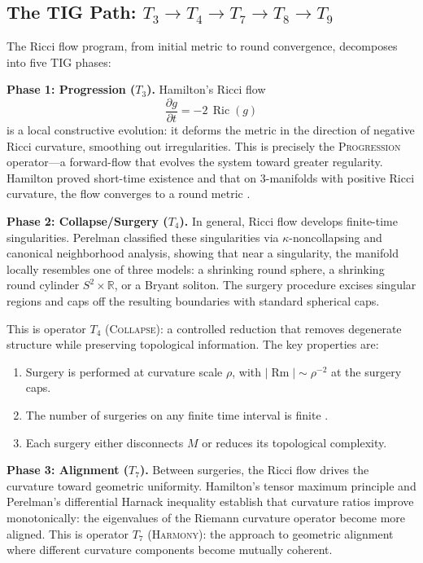 \documentclass[11pt]{article}
\DeclareMathOperator{\Ric}{Ric}
\DeclareMathOperator{\Rm}{Rm}
\begin{document}
\subsection{The TIG Path: $T_3 \to T_4 \to T_7 \to T_8 \to T_9$}
\label{subsec:poinc-path}

The Ricci flow program, from initial metric to round convergence,
decomposes into five TIG phases:

\medskip
\noindent
\textbf{Phase 1: Progression ($T_3$).}
Hamilton's Ricci flow \cite{Ham82}
\begin{equation}
\label{eq:ricci}
\frac{\partial g}{\partial t} = -2\, \Ric(g)
\end{equation}
is a local constructive evolution: it deforms the metric in the
direction of negative Ricci curvature, smoothing out irregularities.
This is precisely the \textsc{Progression} operator---a forward-flow
that evolves the system toward greater regularity.  Hamilton proved
short-time existence and that on 3-manifolds with positive Ricci
curvature, the flow converges to a round metric \cite{Ham82}.

\medskip
\noindent
\textbf{Phase 2: Collapse/Surgery ($T_4$).}
In general, Ricci flow develops finite-time singularities.  Perelman
\cite{Per2} classified these singularities via $\kappa$-noncollapsing
and canonical neighborhood analysis, showing that near a singularity,
the manifold locally resembles one of three models: a shrinking round
sphere, a shrinking round cylinder $S^2 \times \mathbb{R}$, or a
Bryant soliton.  The surgery procedure excises singular regions and
caps off the resulting boundaries with standard spherical caps.

This is operator $T_4$ (\textsc{Collapse}): a controlled reduction that
removes degenerate structure while preserving topological information.
The key properties are:
\begin{enumerate}
\item Surgery is performed at curvature scale $\rho$, with
$|\Rm| \sim \rho^{-2}$ at the surgery caps.
\item The number of surgeries on any finite time interval is finite
\cite{Per2}.
\item Each surgery either disconnects $M$ or reduces its topological
complexity.
\end{enumerate}

\medskip
\noindent
\textbf{Phase 3: Alignment ($T_7$).}
Between surgeries, the Ricci flow drives the curvature toward
geometric uniformity.  Hamilton's tensor maximum principle and
Perelman's differential Harnack inequality establish that curvature
ratios improve monotonically: the eigenvalues of the Riemann curvature
operator become more aligned.  This is operator $T_7$
(\textsc{Harmony}): the approach to geometric alignment where
different curvature components become mutually coherent.
\end{document}
